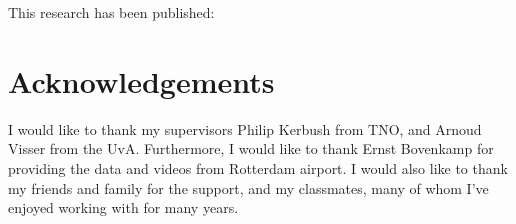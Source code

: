 \documentclass[11pt, a4paper]{book}
\begin{document}
\begingroup
This research has been published: 
\renewcommand{\chapter}[2]{}
\endgroup
\graphicspath{{.}{../results}}


\listoftodos
\newpage
\section{Acknowledgements}
I would like to thank my supervisors Philip Kerbush from TNO, and Arnoud Visser from the UvA. Furthermore, I would like to thank Ernst Bovenkamp for providing the data and videos from Rotterdam airport. I would also like to thank my friends and family for the support, and my classmates, many of whom I've enjoyed working with for many years.
\newpage
\tableofcontents
\newpage

\mainmatter
\end{document}
